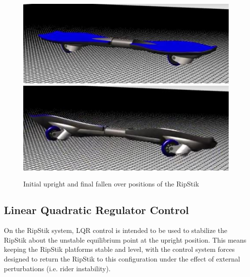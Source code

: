 \begin{figure}[!htb]
	\centering
	\includegraphics[width=\linewidth]{rest}
	\endminipage\hspace{1em}%
	\includegraphics[width=\linewidth]{fall}
	\endminipage
	\caption{Initial upright and final fallen over positions of the RipStik}\label{fig:fallcaster}	
\end{figure}

\subsection{Linear Quadratic Regulator Control}
On the RipStik system, LQR control is intended to be used to stabilize the RipStik about the unstable equilibrium point at the upright position. 
This means keeping the RipStik platforms stable and level, with the control system forces designed to return the RipStik to this configuration under the effect of external perturbations (i.e. rider instability).

